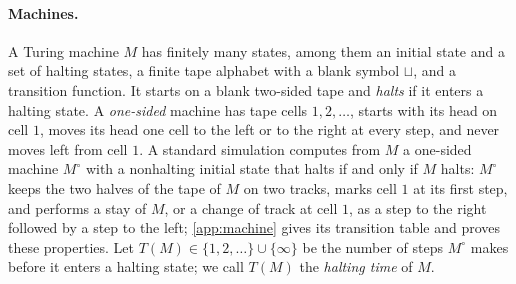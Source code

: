 \paragraph{Machines.} A Turing machine $M$ has finitely many states, among them an initial state and a set of halting states, a finite tape alphabet with a blank symbol $\sqcup$, and a transition function. It starts on a blank two-sided tape and \emph{halts} if it enters a halting state. A \emph{one-sided} machine has tape cells $1,2,\dots$, starts with its head on cell $1$, moves its head one cell to the left or to the right at every step, and never moves left from cell $1$. A standard simulation computes from $M$ a one-sided machine $M^\circ$ with a nonhalting initial state that halts if and only if $M$ halts: $M^\circ$ keeps the two halves of the tape of $M$ on two tracks, marks cell $1$ at its first step, and performs a stay of $M$, or a change of track at cell $1$, as a step to the right followed by a step to the left; \cref{app:machine} gives its transition table and proves these properties. Let $T(M)\in\{1,2,\dots\}\cup\{\infty\}$ be the number of steps $M^\circ$ makes before it enters a halting state; we call $T(M)$ the \emph{halting time} of $M$.


